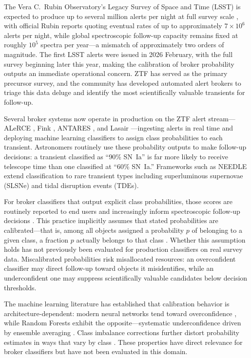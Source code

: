 \documentclass[twocolumn]{aastex631}
\begin{document}
The Vera C.~Rubin Observatory's Legacy Survey of Space and Time
(LSST) is expected to produce up to several million alerts per night
at full survey scale \citep{ivezic2019}, with official Rubin reports
quoting eventual rates of up to approximately $7\times10^6$ alerts
per night, while global spectroscopic follow-up capacity remains fixed
at roughly $10^5$ spectra per year---a mismatch of approximately two
orders of magnitude. The first LSST alerts were
issued in 2026 February, with the full survey beginning later this
year, making the calibration of broker probability outputs an immediate
operational concern. ZTF \citep{bellm2019} has served as the primary
precursor survey, and the community has developed automated alert
brokers to triage this data deluge and identify the most scientifically
valuable transients for follow-up.

Several broker systems now operate in production on the ZTF alert
stream---ALeRCE \citep{forster2021}, Fink \citep{moller2021}, ANTARES
\citep{narayan2018}, and Lasair \citep{smith2019}---ingesting alerts in
real time and deploying machine learning classifiers to assign class
probabilities to each transient. Astronomers routinely use these
probability outputs to make follow-up decisions: a transient classified
as ``90\% SN~Ia'' is far more likely to receive telescope time than one
classified at ``60\% SN~Ia.'' Frameworks such as NEEDLE \citep{sheng2024}
extend classification to rare transient types including superluminous
supernovae (SLSNe) and tidal disruption events (TDEs).

For broker classifiers that output explicit class probabilities, those
scores are routinely reported to end users and increasingly inform
spectroscopic follow-up decisions \citep{forster2021, moller2021,
sheng2024}. This practice implicitly assumes that stated probabilities
are calibrated---that is, among all objects assigned a probability $p$
of belonging to a given class, a fraction $p$ actually belongs to that
class \citep{dawid1982}. Whether this assumption holds has not previously
been evaluated for production classifiers on real survey data.
Miscalibrated probabilities risk misallocated resources: an overconfident
classifier may direct follow-up toward objects it misidentifies, while an
underconfident one may suppress scientifically valuable candidates below
decision thresholds.

The machine learning literature has established that calibration behavior
is architecture-dependent: modern neural networks tend toward
overconfidence \citep{guo2017}, while Random Forests exhibit the
opposite---systematic underconfidence driven by ensemble averaging
\citep{niculescumizil2005, bostrom2008}. Class imbalance corrections
further distort probability estimates in ways that vary by class
\citep{vandengoorbergh2022}. These properties have direct relevance for
broker classifiers but have not been evaluated in this domain.
\end{document}
